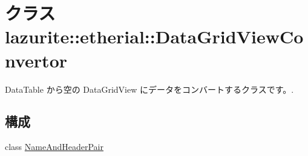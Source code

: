 \hypertarget{classlazurite_1_1etherial_1_1_data_grid_view_convertor}{
\section{クラス lazurite::etherial::DataGridViewConvertor}
\label{classlazurite_1_1etherial_1_1_data_grid_view_convertor}
}


DataTable から空の DataGridView にデータをコンバートするクラスです。.  
\subsection*{構成}
\begin{DoxyCompactItemize}
\item 
class \hyperlink{classlazurite_1_1etherial_1_1_data_grid_view_convertor_1_1_name_and_header_pair}{NameAndHeaderPair}
\end{DoxyCompactItemize}
